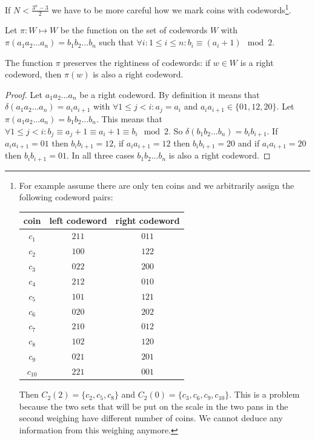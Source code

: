 If $N < \frac{3^n - 3}{2}$ we have to be more careful how we mark coins with codewords\footnote{For example assume there are only ten coins and we arbitrarily assign the following codeword pairs:
\begin{center}
\begin{tabular}{ |c|c|c| } 
 \hline
 coin & left codeword & right codeword \\
 \hline
 $c_1$ & $211$ & $011$ \\
 $c_2$ & $100$ & $122$ \\  
 $c_3$ & $022$ & $200$ \\
 $c_4$ & $212$ & $010$ \\
 $c_5$ & $101$ & $121$ \\
 $c_6$ & $020$ & $202$ \\
 $c_7$ & $210$ & $012$ \\
 $c_8$ & $102$ & $120$ \\
 $c_9$ & $021$ & $201$ \\
 $c_{10}$ & $221$ & $001$ \\
 \hline
\end{tabular}
\end{center}
Then $C_2(2) = \{c_2, c_5, c_8\}$ and $C_2(0) = \{c_3, c_6, c_9, c_{10}\}$. This is a problem because the two sets that will be put on the scale in the two pans in the second weighing have different number of coins. We cannot deduce any information from this weighing anymore.
}.

Let $\pi: W \mapsto W$ be the function on the set of codewords $W$ with $\pi(a_1 a_2 \ldots a_n) = b_1 b_2 \ldots b_n$ such that $\forall i: 1 \leq i \leq n: b_i \equiv (a_i + 1) \mod 2$.

\begin{lem}\label{coin_pi}
The function $\pi$ preserves the rightiness of codewords: if $w \in W$ is a right codeword, then $\pi(w)$ is also a right codeword.
\end{lem}

\begin{proof}
Let $a_1 a_2 \ldots a_n$ be a right codeword. By definition it means that $\delta(a_1 a_2 \ldots a_n)=a_i a_{i+1}$ with $\forall 1 \leq j < i: a_j = a_i$ and $a_i a_{i+1} \in \{01, 12, 20\}$. Let $\pi(a_1 a_2 \ldots a_n) = b_1 b_2 \ldots b_n$. This means that $\forall 1 \leq j < i: b_j \equiv a_j + 1 \equiv a_i + 1 \equiv b_i \mod 2$. So $\delta(b_1 b_2 \ldots b_n) = b_i b_{i+1}$. If $a_i a_{i+1}=01$ then $b_i b_{i+1}=12$, if $a_i a_{i+1}=12$ then $b_i b_{i+1}=20$ and if $a_i a_{i+1}=20$ then $b_i b_{i+1}=01$. In all three cases $b_1 b_2 \ldots b_n$ is also a right codeword.
\end{proof}

